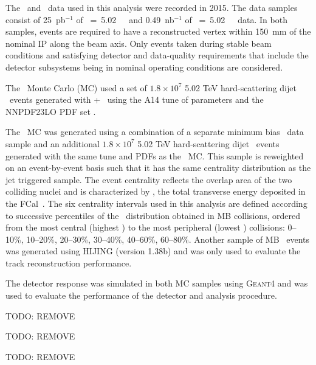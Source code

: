 
The \PbPb\ and \pp\ data used in this analysis were recorded in 2015.
 The data samples consist of 25~pb$^{-1}$ of \sqrts~=~5.02~\TeV\ \pp\ and 0.49~nb$^{-1}$ of \sqrtsnn~=~5.02~\TeV\
\pbpb\ data. In both samples, events are required to have a reconstructed vertex
within 150~mm of the nominal IP along the beam axis.
Only events taken during stable beam conditions and satisfying detector and data-quality requirements that include the detector subsystems being in nominal operating conditions are considered. 


The \pp\ Monte Carlo (MC) used a set of $1.8\times10^7$ 5.02 TeV hard-scattering dijet \pp\ events generated with \powheg{}+\pythiaeight\ \cite{Nason:2004rx,Sjostrand:2014zea} using the A14 tune of parameters \cite{ATLAS2014021} and the NNPDF23LO PDF set \cite{Ball:2012cx}.

The \pbpb\ MC was generated using a combination of a separate minimum bias \pbpb\ data sample and an additional $1.8\times10^7$ 5.02 TeV hard-scattering dijet \pp\ events generated with the same tune and PDFs as the \pp\ MC. This sample is reweighted on an event-by-event basis such that it has the same centrality distribution as the jet triggered sample. The event centrality reflects the overlap area of the two colliding nuclei and is characterized by \ETfcal, the total transverse energy deposited in the FCal~\cite{Aaboud:2017tql}. The six centrality intervals used in this analysis are defined according to successive percentiles of the \ETfcal\ distribution obtained in MB collisions, ordered from the most central (highest \ETfcal) to the most peripheral (lowest \ETfcal) collisions: 0--10\%, 10--20\%, 20--30\%, 30--40\%, 40--60\%, 60--80\%. Another sample of MB \pbpb\ events was generated using HIJING (version 1.38b) \cite{Wang:1991hta} and was only used to evaluate the track reconstruction performance. 	


 The detector response was simulated in both MC samples using \textsc{Geant4} \cite{Agostinelli:2002hh,Aad:2010ah} and was used to evaluate the performance of the detector and analysis procedure. 

TODO: REMOVE

TODO: REMOVE

TODO: REMOVE



